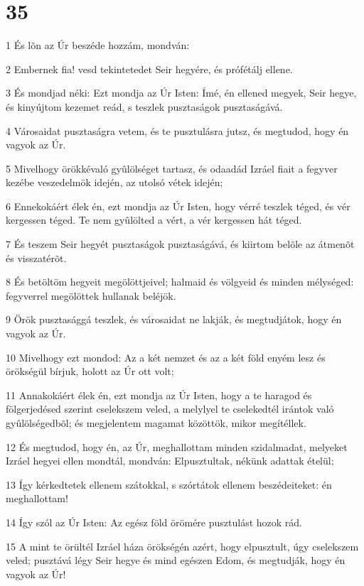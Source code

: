\chapter{35}

\par 1 És lõn az Úr beszéde hozzám, mondván:
\par 2 Embernek fia! vesd tekintetedet Seir hegyére, és prófétálj ellene.
\par 3 És mondjad néki: Ezt mondja az Úr Isten: Ímé, én ellened megyek, Seir hegye, és kinyújtom kezemet reád, s teszlek pusztaságok pusztaságává.
\par 4 Városaidat pusztaságra vetem, és te pusztulásra jutsz, és megtudod, hogy én vagyok az Úr.
\par 5 Mivelhogy örökkévaló gyûlölséget tartasz, és odaadád Izráel fiait a fegyver kezébe veszedelmök idején, az utolsó vétek  idején;
\par 6 Ennekokáért élek én, ezt mondja az Úr Isten, hogy vérré teszlek téged, és vér kergessen téged. Te nem gyûlölted a vért, a vér kergessen hát téged.
\par 7 És teszem Seir hegyét pusztaságok pusztaságává, és kiirtom belõle az átmenõt és visszatérõt.
\par 8 És betöltöm hegyeit megölöttjeivel; halmaid és völgyeid és minden mélységed: fegyverrel megölöttek hullanak beléjök.
\par 9 Örök pusztasággá teszlek, és városaidat ne lakják, és megtudjátok, hogy én vagyok az Úr.
\par 10 Mivelhogy ezt mondod: Az a két nemzet és az a két föld enyém lesz és örökségül bírjuk, holott az Úr ott volt;
\par 11 Annakokáért élek én, ezt mondja az Úr Isten, hogy a te haragod és fölgerjedésed szerint cselekszem veled, a melylyel te cselekedtél irántok való gyûlölségedbõl; és megjelentem magamat közöttök, mikor megítéllek.
\par 12 És megtudod, hogy én, az Úr, meghallottam minden szidalmadat, melyeket Izráel hegyei ellen mondtál, mondván: Elpusztultak, nékünk adattak ételül;
\par 13 Így kérkedtetek ellenem szátokkal, s szórtátok ellenem beszédeiteket:  én meghallottam!
\par 14 Így szól az Úr Isten: Az egész föld örömére pusztulást hozok rád.
\par 15 A mint te örültél Izráel háza örökségén azért, hogy elpusztult, úgy cselekszem veled; pusztává légy Seir hegye és mind egészen Edom, és megtudják, hogy én vagyok az Úr!

